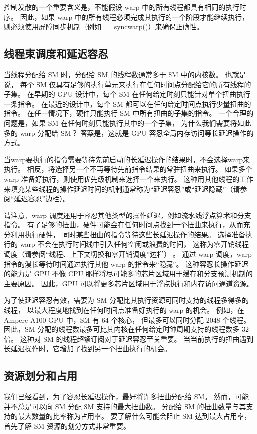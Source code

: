 控制发散的一个重要含义是，不能假设 warp 中的所有线程都具有相同的执行时序。 
因此，如果 warp 中的所有线程必须完成其执行的一个阶段才能继续执行，
则必须使用屏障同步机制（例如 \_\_syncwarp()）来确保正确性。

\subsection{线程束调度和延迟容忍}
当线程分配给 SM 时，分配给 SM 的线程数通常多于 SM 中的内核数。 也就是说，
每个 SM 仅具有足够的执行单元来执行在任何时间点分配给它的所有线程的子集。 
在早期的 GPU 设计中，每个 SM 在任何给定时刻只能针对单个扭曲执行一条指令。 
在最近的设计中，每个 SM 都可以在任何给定时间点执行少量扭曲的指令。 
在任一情况下，硬件只能执行 SM 中所有扭曲的子集的指令。 一个合理的问题是，如果 SM 在任何时刻只能执行其中的一个子集，
为什么我们需要将如此多的 warp 分配给 SM？ 答案是，这就是 GPU 容忍全局内存访问等长延迟操作的方式。

当warp要执行的指令需要等待先前启动的长延迟操作的结果时，不会选择warp来执行。 
相反，将选择另一个不再等待先前指令结果的常驻扭曲来执行。 如果多个 warp 准备好执行，则使用优先级机制来选择一个来执行。 
这种用其他线程的工作来填充某些线程的操作延迟时间的机制通常称为“延迟容忍”或“延迟隐藏”（请参阅“延迟容忍”边栏）。

请注意，warp 调度还用于容忍其他类型的操作延迟，例如流水线浮点算术和分支指令。 
有了足够的扭曲，硬件可能会在任何时间点找到一个扭曲来执行，从而充分利用执行硬件，
同时某些扭曲的指令等待这些长延迟操作的结果。 选择准备执行的 warp 不会在执行时间线中引入任何空闲或浪费的时间，
这称为零开销线程调度（请参阅“线程、上下文切换和零开销调度”边栏） 。 
通过 warp 调度，warp 指令的漫长等待时间通过执行其他 warp 的指令来“隐藏”。 
这种容忍长操作延迟的能力是 GPU 不像 CPU 那样将尽可能多的芯片区域用于缓存和分支预测机制的主要原因。 
因此，GPU 可以将更多芯片区域用于浮点执行和内存访问通道资源。

为了使延迟容忍有效，需要为 SM 分配比其执行资源可同时支持的线程多得多的线程，
以最大程度地找到在任何时间点准备好执行的 warp 的机会。 例如，在 Ampere A100 GPU 中，SM 有 64 个核心，
但最多可以同时分配 2048 个线程。 因此，SM 分配的线程数最多可比其内核在任何给定时钟周期支持的线程数多 32 倍。 
这种对 SM 的线程超额订阅对于延迟容忍至关重要。 当当前执行的扭曲遇到长延迟操作时，它增加了找到另一个扭曲执行的机会。

\subsection{资源划分和占用}
我们已经看到，为了容忍长延迟操作，最好将许多扭曲分配给 SM。 然而，可能并不总是可以向 SM 分配 SM 支持的最大扭曲数。 
分配给 SM 的扭曲数量与其支持的最大数量的比率称为占用率。 
要了解什么可能会阻止 SM 达到最大占用率，首先了解 SM 资源的划分方式非常重要。

